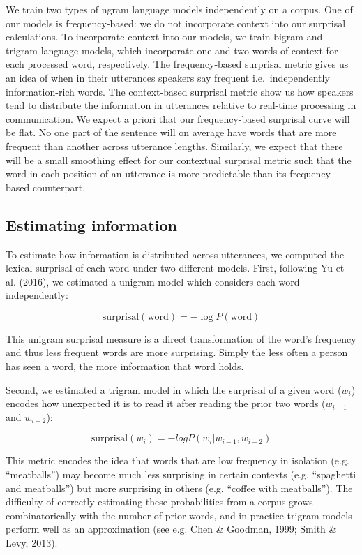 \documentclass[man,floatsintext]{apa6}
\begin{document}
We train two types of ngram language models independently on a corpus. One of our models is frequency-based: we do not incorporate context into our surprisal calculations. To incorporate context into our models, we train bigram and trigram language models, which incorporate one and two words of context for each processed word, respectively. The frequency-based surprisal metric gives us an idea of when in their utterances speakers say frequent i.e.~independently information-rich words. The context-based surprisal metric show us how speakers tend to distribute the information in utterances relative to real-time processing in communication. We expect a priori that our frequency-based surprisal curve will be flat. No one part of the sentence will on average have words that are more frequent than another across utterance lengths. Similarly, we expect that there will be a small smoothing effect for our contextual surprisal metric such that the word in each position of an utterance is more predictable than its frequency-based counterpart.

\hypertarget{estimating-information}{%
\subsection{Estimating information}\label{estimating-information}}

To estimate how information is distributed across utterances, we computed the lexical surprisal of each word under two different models. First, following Yu et al. (2016), we estimated a unigram model which considers each word independently:

\[\text{surprisal}(\text{word}) = -\log P(\text{word})\]

This unigram surprisal measure is a direct transformation of the word's frequency and thus less frequent words are more surprising. Simply the less often a person has seen a word, the more information that word holds.

Second, we estimated a trigram model in which the surprisal of a given word (\(w_i\)) encodes how unexpected it is to read it after reading the prior two words (\(w_{i-1}\) and \(w_{i-2}\)):

\[\text{surprisal}(w_{i}) = -log P(w_i|w_{i-1},w_{i-2})\]

This metric encodes the idea that words that are low frequency in isolation (e.g. \enquote{meatballs}) may become much less surprising in certain contexts (e.g. \enquote{spaghetti and meatballs}) but more surprising in others (e.g. \enquote{coffee with meatballs}). The difficulty of correctly estimating these probabilities from a corpus grows combinatorically with the number of prior words, and in practice trigram models perform well as an approximation (see e.g. Chen \& Goodman, 1999; Smith \& Levy, 2013).
\end{document}
